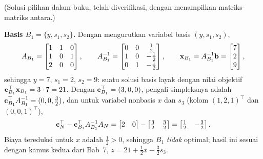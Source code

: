 
(Solusi pilihan dalam buku, telah diverifikasi, dengan menampilkan
matriks-matriks antara.)

\textbf{Basis $B_1 = \{y, s_1, s_2\}$.} Dengan mengurutkan variabel basis
$(y, s_1, s_2)$,
\[
A_{B_1} =
\begin{bmatrix}
1 & 1 & 0 \\
1 & 0 & 1 \\
2 & 0 & 0
\end{bmatrix},
\qquad
A_{B_1}^{-1} =
\begin{bmatrix}
0 & 0 & \tfrac12 \\
1 & 0 & -\tfrac12 \\
0 & 1 & -\tfrac12
\end{bmatrix},
\qquad
\mathbf{x}_{B_1} = A_{B_1}^{-1}\mathbf{b} = \begin{bmatrix} 7 \\ 2 \\ 9 \end{bmatrix},
\]
sehingga $y = 7$, $s_1 = 2$, $s_2 = 9$: suatu solusi basis layak dengan nilai
objektif $\mathbf{c}_{B_1}^\top \mathbf{x}_{B_1} = 3 \cdot 7 = 21$. Dengan
$\mathbf{c}_{B_1}^\top = (3, 0, 0)$, pengali simpleksnya adalah
$\mathbf{c}_{B_1}^\top A_{B_1}^{-1} = (0, 0, \tfrac32)$, dan untuk variabel nonbasis
$x$ dan $s_3$ (kolom $(1,2,1)^\top$ dan $(0,0,1)^\top$),
\[
\mathbf{c}_N^\top - \mathbf{c}_{B_1}^\top A_{B_1}^{-1} A_N
= \begin{bmatrix} 2 & 0 \end{bmatrix}
- \begin{bmatrix} \tfrac32 & \tfrac32 \end{bmatrix}
= \begin{bmatrix} \tfrac12 & -\tfrac32 \end{bmatrix}.
\]
Biaya tereduksi untuk $x$ adalah $\tfrac12 > 0$, sehingga $B_1$
\emph{tidak} optimal; hasil ini sesuai dengan kamus kedua dari Bab~7,
$z = 21 + \tfrac12 x - \tfrac32 s_3$.

